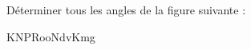 
\begin{exercice}\label{exo2smath-0068}

    Déterminer tous les angles de la figure suivante :

KNPRooNdvKmg

\end{exercice}
